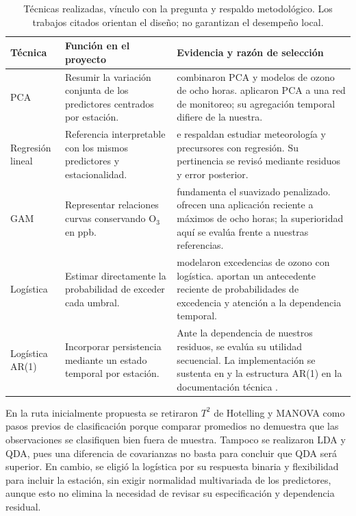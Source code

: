 \documentclass[11pt,letterpaper]{article}
\begin{document}
\begin{table}[!htbp]\centering\small
\begin{tabular}{@{}P{2.5cm}P{5.2cm}P{7.5cm}@{}}\toprule
Técnica & Función en el proyecto & Evidencia y razón de selección\\\midrule
PCA & Resumir la variación conjunta de los predictores centrados por estación. & \citet{laban2020} combinaron PCA y modelos de ozono de ocho horas. \citet{nunez2019} aplicaron PCA a una red de monitoreo; su agregación temporal difiere de la nuestra.\\\addlinespace
Regresión lineal & Referencia interpretable con los mismos predictores y estacionalidad. & \citet{laban2020} e \citet{iglesias2020} respaldan estudiar meteorología y precursores con regresión. Su pertinencia se revisó mediante residuos y error posterior.\\\addlinespace
GAM & Representar relaciones curvas conservando O$_3$ en ppb. & \citet{wood2017} fundamenta el suavizado penalizado. \citet{gao2022} ofrecen una aplicación reciente a máximos de ocho horas; la superioridad aquí se evalúa frente a nuestras referencias.\\\addlinespace
Logística & Estimar directamente la probabilidad de exceder cada umbral. & \citet{otero2016} modelaron excedencias de ozono con logística. \citet{chang2025} aportan un antecedente reciente de probabilidades de excedencia y atención a la dependencia temporal.\\\addlinespace
Logística AR(1) & Incorporar persistencia mediante un estado temporal por estación. & Ante la dependencia de nuestros residuos, se evalúa su utilidad secuencial. La implementación se sustenta en \citet{brooks2017} y la estructura AR(1) en la documentación técnica \citep{glmmtmb}.\\\bottomrule
\end{tabular}
\caption{Técnicas realizadas, vínculo con la pregunta y respaldo metodológico. Los trabajos citados orientan el diseño; no garantizan el desempeño local.}\label{tab:metodos}
\end{table}

En la ruta inicialmente propuesta se retiraron $T^2$ de Hotelling y MANOVA como pasos previos de clasificación porque comparar promedios no demuestra que las observaciones se clasifiquen bien fuera de muestra. Tampoco se realizaron LDA y QDA, pues una diferencia de covarianzas no basta para concluir que QDA será superior. En cambio, se eligió la logística por su respuesta binaria y flexibilidad para incluir la estación, sin exigir normalidad multivariada de los predictores, aunque esto no elimina la necesidad de revisar su especificación y dependencia residual.
\end{document}

